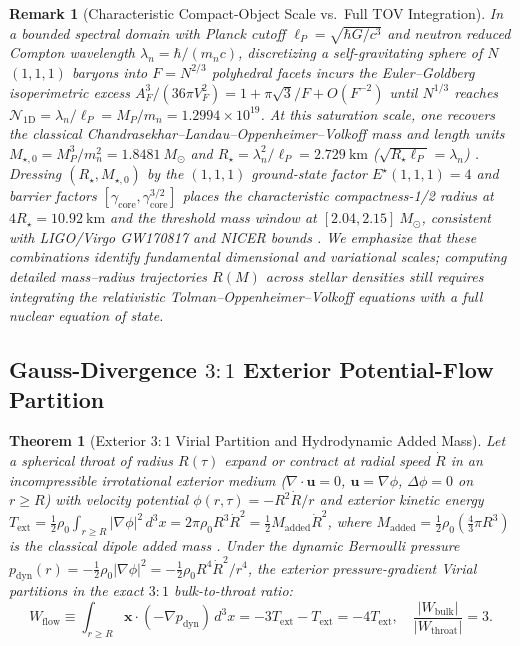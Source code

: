 \documentclass[pdflatex,sn-mathphys-num]{sn-jnl}
\theoremstyle{thmstyleone}
\newtheorem{theorem}{Theorem}
\theoremstyle{thmstyletwo}
\newtheorem{remark}{Remark}
\theoremstyle{thmstylethree}
\begin{document}
\begin{remark}[Characteristic Compact-Object Scale vs.\ Full TOV Integration]\label{rem:tov}
In a bounded spectral domain with Planck cutoff $\ell_P = \sqrt{\hbar G/c^3}$ and neutron reduced Compton wavelength $\lambda_n = \hbar/(m_n c)$, discretizing a self-gravitating sphere of $N$ $(1,1,1)$ baryons into $F = N^{2/3}$ polyhedral facets incurs the Euler--Goldberg isoperimetric excess $A_F^3/(36\pi V_F^2) = 1 + \pi\sqrt{3}/F + O(F^{-2})$ \cite{Goldberg1935} until $N^{1/3}$ reaches $\mathcal{N}_{1\mathrm{D}} = \lambda_n/\ell_P = M_P/m_n = 1.2994\times 10^{19}$. At this saturation scale, one recovers the classical Chandrasekhar--Landau--Oppenheimer--Volkoff mass and length units $M_{\star,0} = M_P^3/m_n^2 = 1.8481\ M_\odot$ and $R_\star = \lambda_n^2/\ell_P = 2.729\ \mathrm{km}$ ($\sqrt{R_\star\ell_P} = \lambda_n$) \cite{Chandrasekhar1931,OppenheimerVolkoff1939}. Dressing $(R_\star, M_{\star,0})$ by the $(1,1,1)$ ground-state factor $E^\star(1,1,1)=4$ and barrier factors $[\gamma_{\mathrm{core}}, \gamma_{\mathrm{core}}^{3/2}]$ places the characteristic compactness-1/2 radius at $4R_\star = 10.92\ \mathrm{km}$ and the threshold mass window at $[2.04, 2.15]\ M_\odot$, consistent with LIGO/Virgo GW170817 and NICER bounds \cite{GW170817_2018,MillerNICER2021}. We emphasize that these combinations identify fundamental dimensional and variational scales; computing detailed mass--radius trajectories $R(M)$ across stellar densities still requires integrating the relativistic Tolman--Oppenheimer--Volkoff equations with a full nuclear equation of state.
\end{remark}

\subsection{Gauss-Divergence $3:1$ Exterior Potential-Flow Partition}\label{subsec:virial}

\begin{theorem}[Exterior $3:1$ Virial Partition and Hydrodynamic Added Mass]\label{thm:virial}
Let a spherical throat of radius $R(\tau)$ expand or contract at radial speed $\dot{R}$ in an incompressible irrotational exterior medium ($\nabla\cdot\mathbf{u}=0$, $\mathbf{u}=\nabla\phi$, $\Delta\phi=0$ on $r \ge R$) with velocity potential $\phi(r,\tau) = -R^2\dot{R}/r$ and exterior kinetic energy $T_{\mathrm{ext}} = \frac{1}{2}\rho_0\int_{r\ge R}|\nabla\phi|^2\,d^3x = 2\pi\rho_0 R^3\dot{R}^2 = \frac{1}{2}M_{\mathrm{added}}\dot{R}^2$, where $M_{\mathrm{added}} = \frac{1}{2}\rho_0(\frac{4}{3}\pi R^3)$ is the classical dipole added mass \cite{Lamb1932}. Under the dynamic Bernoulli pressure $p_{\mathrm{dyn}}(r) = -\frac{1}{2}\rho_0|\nabla\phi|^2 = -\frac{1}{2}\rho_0 R^4\dot{R}^2/r^4$, the exterior pressure-gradient Virial partitions in the exact $3:1$ bulk-to-throat ratio:
\begin{equation}\label{eq:virial_3to1}
W_{\mathrm{flow}} \equiv \int_{r\ge R} \mathbf{x}\cdot(-\nabla p_{\mathrm{dyn}})\,d^3x = -3T_{\mathrm{ext}} - T_{\mathrm{ext}} = -4T_{\mathrm{ext}}, \quad \frac{|W_{\mathrm{bulk}}|}{|W_{\mathrm{throat}}|} = 3.
\end{equation}
\end{theorem}
\end{document}
